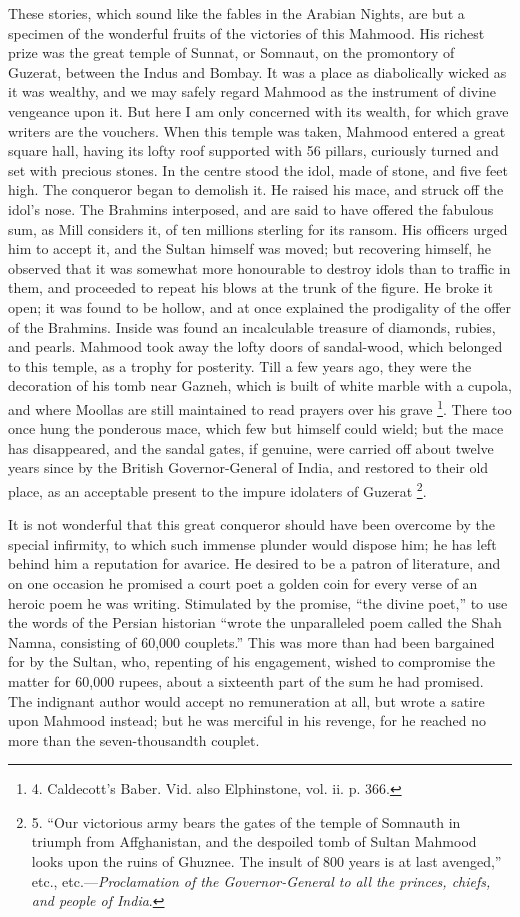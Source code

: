 These stories, which sound
like the fables in the Arabian Nights, are but a specimen of the
wonderful fruits of the victories of this Mahmood. His richest prize
was the great temple of Sunnat, or Somnaut, on the promontory of
Guzerat, between the Indus and Bombay. It was a place as diabolically
wicked as it was wealthy, and we may safely regard Mahmood as the
instrument of divine vengeance upon it. But here I am only concerned
with its wealth, for which grave writers are the vouchers. When this
temple was taken, Mahmood entered a great square hall, having its
lofty roof supported with 56 pillars, curiously turned and set with
precious stones. In the centre stood the idol, made of stone, and
five feet high. The conqueror began to demolish it. He raised his
mace, and struck off the idol's nose. The Brahmins interposed, and are
said to have offered the fabulous sum, as Mill considers it, of ten
millions sterling for its ransom. His officers urged him to accept it,
and the Sultan himself was moved; but recovering himself, he observed
that it was somewhat more honourable to destroy idols than to traffic
in them, and proceeded to repeat his blows at the trunk of the figure.
He broke it open; it was found to be hollow, and at once explained the
prodigality of the offer of the Brahmins. Inside was found an
incalculable treasure of diamonds, rubies, and pearls. Mahmood took
away the lofty doors of sandal-wood, which belonged to this temple, as
a trophy for posterity. Till a few years ago, they were the decoration
of his tomb near Gazneh, which is built of white marble with a cupola,
and where Moollas are still maintained to read prayers over his grave
\footnote{4.
Caldecott's Baber. Vid. also Elphinstone, vol. ii. p. 366.}. There too once hung the
ponderous mace, which few but himself could wield; but the mace has
disappeared, and the sandal gates, if genuine, were carried off about
twelve years since by the British Governor-General of India, and
restored to their old place, as an acceptable present to the impure
idolaters of Guzerat \footnote{5.
``Our victorious army bears the gates of the temple of Somnauth in
triumph from Affghanistan, and the despoiled tomb of Sultan Mahmood
looks upon the ruins of Ghuznee. The insult of 800 years is at last
avenged,'' etc., etc.—\emph{Proclamation of the Governor-General to all
the princes, chiefs, and people of India}.}.

It is not wonderful that this
great conqueror should have been overcome by the special infirmity, to
which such immense plunder would dispose him; he has left behind
him a reputation for avarice. He desired to be a patron of literature,
and on one occasion he promised a court poet a golden coin for every
verse of an heroic poem he was writing. Stimulated by the promise, ``the
divine poet,'' to use the words of the Persian historian ``wrote the
unparalleled poem called the Shah Namna, consisting of 60,000
couplets.'' This was more than had been bargained for by the Sultan,
who, repenting of his engagement, wished to compromise the matter for
60,000 rupees, about a sixteenth part of the sum he had promised. The
indignant author would accept no remuneration at all, but wrote a
satire upon Mahmood instead; but he was merciful in his revenge, for
he reached no more than the seven-thousandth couplet.

